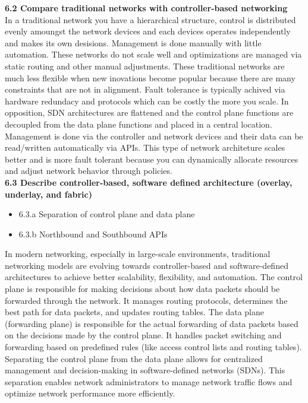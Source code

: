 \documentclass{article}
\begin{document}
\textbf{6.2 Compare traditional networks with controller-based networking}\\

	In a traditional network you have a hierarchical structure, control is distributed evenly amoungst the network devices and each devices operates independently and makes its own desisions. Management is done manually with little automation. These networks do not scale well and optimizations are managed via static routing and other manual adjustments. These traditional networks are much less flexible when new inovations become popular because there are many constraints that are not in alignment. Fault tolerance is typically achived via hardware redundacy and protocols which can be costly the more you scale. In opposition, SDN architectures are flattened and the control plane functions are decoupled from the data plane functions and placed in a central location. Management is done via the controller and network devices and their data can be read/written automatically via APIs. This type of network architeture scales better and is more fault tolerant because you can dynamically allocate resources and adjust network behavior through policies.\\
  
\textbf{6.3 Describe controller-based, software defined architecture (overlay, underlay, and fabric)}
\begin{itemize}
\item 6.3.a Separation of control plane and data plane
\item 6.3.b Northbound and Southbound APIs
\end{itemize}

	In modern networking, especially in large-scale environments, traditional networking models are evolving towards controller-based and software-defined architectures to achieve better scalability, flexibility, and automation. The control plane is responsible for making decisions about how data packets should be forwarded through the network. It manages routing protocols, determines the best path for data packets, and updates routing tables. The data plane (forwarding plane) is responsible for the actual forwarding of data packets based on the decisions made by the control plane. It handles packet switching and forwarding based on predefined rules (like access control lists and routing tables). Separating the control plane from the data plane allows for centralized management and decision-making in software-defined networks (SDNs). This separation enables network administrators to manage network traffic flows and optimize network performance more efficiently.\\
	
\end{document}
